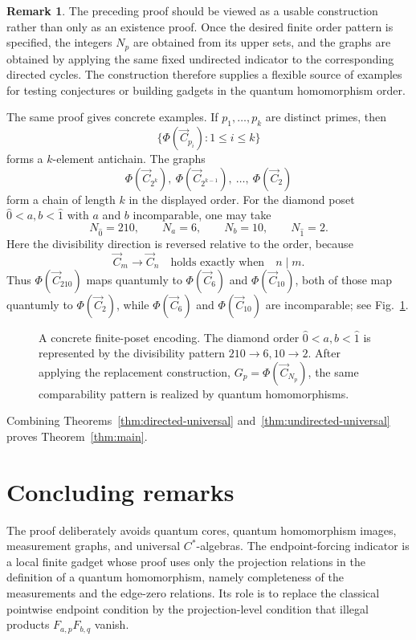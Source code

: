 \documentclass[11pt]{amsart}
\theoremstyle{plain}
\theoremstyle{definition}
\newtheorem{remark}[theorem]{Remark}
\newcommand{\Cyc}{\overrightarrow{C}}
\begin{document}
\begin{remark}
The preceding proof should be viewed as a usable construction rather than only as an existence proof.  Once the desired finite order pattern is specified, the integers $N_p$ are obtained from its upper sets, and the graphs are obtained by applying the same fixed undirected indicator to the corresponding directed cycles.  The construction therefore supplies a flexible source of examples for testing conjectures or building gadgets in the quantum homomorphism order.

The same proof gives concrete examples.  If $p_1,\ldots,p_k$ are distinct primes, then
\[
   \{\Phi(\Cyc_{p_i}):1\le i\le k\}
\]
forms a $k$-element antichain.  The graphs
\[
   \Phi(\Cyc_{2^k}),\ \Phi(\Cyc_{2^{k-1}}),\ \ldots,\ \Phi(\Cyc_2)
\]
form a chain of length $k$ in the displayed order.  For the diamond poset $\hat 0<a,b<\hat 1$ with $a$ and $b$ incomparable, one may take
\[
   N_{\hat 0}=210,
   \qquad
   N_a=6,
   \qquad
   N_b=10,
   \qquad
   N_{\hat 1}=2.
\]
Here the divisibility direction is reversed relative to the order, because
\[
   \Cyc_m\to\Cyc_n
   \quad\text{holds exactly when}\quad
   n\mid m.
\]
Thus $\Phi(\Cyc_{210})$ maps quantumly to $\Phi(\Cyc_6)$ and $\Phi(\Cyc_{10})$, both of those map quantumly to $\Phi(\Cyc_2)$, while $\Phi(\Cyc_6)$ and $\Phi(\Cyc_{10})$ are incomparable; see Fig.~\ref{fig:diamond-encoding}.
\end{remark}

\begin{figure}[htbp]
\centering

\caption{A concrete finite-poset encoding.  The diamond order $\hat 0<a,b<\hat 1$ is represented by the divisibility pattern $210\to 6,10\to 2$.  After applying the replacement construction, $G_p=\Phi(\overrightarrow C_{N_p})$, the same comparability pattern is realized by quantum homomorphisms.}
\label{fig:diamond-encoding}
\end{figure}

Combining Theorems~\ref{thm:directed-universal} and~\ref{thm:undirected-universal} proves Theorem~\ref{thm:main}.

\section{Concluding remarks}

The proof deliberately avoids quantum cores, quantum homomorphism images, measurement graphs, and universal $C^*$-algebras.  The endpoint-forcing indicator is a local finite gadget whose proof uses only the projection relations in the definition of a quantum homomorphism, namely completeness of the measurements and the edge-zero relations.  Its role is to replace the classical pointwise endpoint condition by the projection-level condition that illegal products $F_{a,p}F_{b,q}$ vanish.
\end{document}
